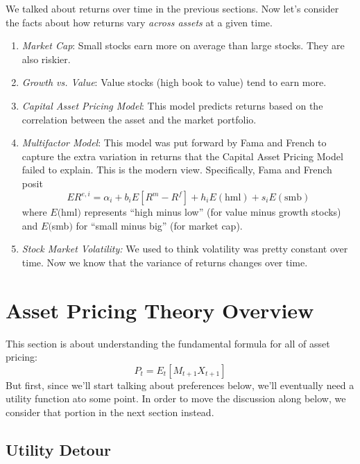 \documentclass[a4paper,12pt]{scrartcl}
\begin{document}
We talked about returns over time in the previous sections. Now 
let's consider the facts about how returns vary \emph{across assets}
at a given time.
\begin{enumerate}
    \item {\sl Market Cap}: Small stocks earn more on average than
	large stocks.  They are also riskier.
    \item {\sl Growth vs. Value}: Value stocks (high book to value)
	tend to earn more.
    \item {\sl Capital Asset Pricing Model}: This model predicts
	returns based on the correlation between the asset and
	the market portfolio.
    \item {\sl Multifactor Model}: This model was put forward by
	Fama and French to capture the extra variation in returns
	that the Capital Asset Pricing Model failed to explain.
	This is the modern view. Specifically, Fama and French posit
	\begin{equation}
	    \label{ff3fm}
	    ER^{e,i} = \alpha_i + b_iE[R^m - R^f] + h_i E(\text{hml})
		+ s_i E(\text{smb})
	\end{equation}
	where $E($hml$)$ represents ``high minus low'' (for 
	value minus growth stocks)
	and $E($smb$)$ for ``small minus big'' (for market cap).
    \item {\sl Stock Market Volatility:} We used to think volatility
	was pretty constant over time.  Now we know that the
	variance of returns changes over time.
\end{enumerate}


\newpage
\section{Asset Pricing Theory Overview}

This section is about understanding the fundamental formula for all
of asset pricing: 
\begin{equation}
    \label{pemx}
    P_t = E_t[M_{t+1} X_{t+1}]
\end{equation}
But first, 
since we'll start talking about preferences below, we'll eventually
need a utility function ato some point.  In order to move the 
discussion along below, we consider that portion in the next
section instead.

\subsection{Utility Detour}
\end{document}
